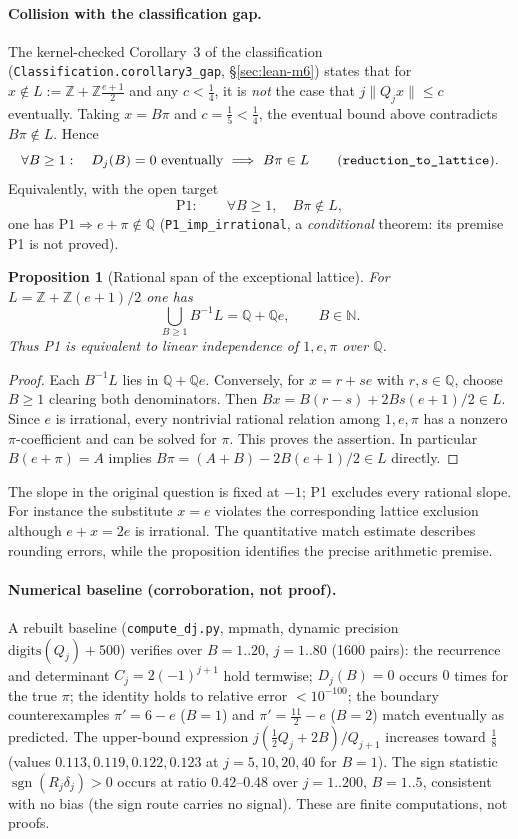 \documentclass[11pt]{amsart}
\newtheorem{proposition}[theorem]{Proposition}
\theoremstyle{definition}
\theoremstyle{remark}
\numberwithin{equation}{section}
\newcommand{\Q}{\mathbb{Q}}
\newcommand{\Z}{\mathbb{Z}}
\newcommand{\N}{\mathbb{N}}
\begin{document}
\paragraph{Collision with the classification gap.} The kernel-checked Corollary~3 of the classification (\texttt{Classification.\allowbreak{}corollary3\_\allowbreak{}gap}, \S\ref{sec:lean-m6}) states that for $x\notin L:=\Z+\Z\frac{e+1}{2}$ and any $c<\tfrac14$, it is \emph{not} the case that $j\|Q_jx\|\le c$ eventually. Taking $x=B\pi$ and $c=\tfrac15<\tfrac14$, the eventual bound above contradicts $B\pi\notin L$. Hence
\[
\forall B\ge1:\quad D_j(B)=0\ \text{eventually}\ \Longrightarrow\ B\pi\in L
\qquad\text{(\texttt{reduction\_to\_lattice}).}
\]
Equivalently, with the open target
\[
\mathrm{P1}:\qquad \forall B\ge1,\quad B\pi\notin L,
\]
one has $\mathrm{P1}\Rightarrow e+\pi\notin\Q$ (\texttt{P1\_imp\_irrational}, a \emph{conditional} theorem: its premise P1 is not proved).

\begin{proposition}[Rational span of the exceptional lattice]
\label{prop:rational-span}
For $L=\Z+\Z(e+1)/2$ one has
\[
\bigcup_{B\ge1} B^{-1}L=\Q+\Q e,\qquad B\in\N.
\]
Thus P1 is equivalent to linear independence of $1,e,\pi$ over $\Q$.
\end{proposition}
\begin{proof}
Each $B^{-1}L$ lies in $\Q+\Q e$. Conversely, for $x=r+se$ with
$r,s\in\Q$, choose $B\ge1$ clearing both denominators. Then
$Bx=B(r-s)+2Bs(e+1)/2\in L$. Since $e$ is irrational, every
nontrivial rational relation among $1,e,\pi$ has a nonzero
$\pi$-coefficient and can be solved for $\pi$. This proves the assertion.
In particular $B(e+\pi)=A$ implies
$B\pi=(A+B)-2B(e+1)/2\in L$ directly.
\end{proof}
The slope in the original question is fixed at $-1$; P1 excludes every
rational slope. For instance the substitute $x=e$ violates the
corresponding lattice exclusion although $e+x=2e$ is irrational.
The quantitative match estimate describes rounding errors, while the
proposition identifies the precise arithmetic premise.

\paragraph{Numerical baseline (corroboration, not proof).} A rebuilt baseline (\texttt{compute\_dj.py}, mpmath, dynamic precision $\mathrm{digits}(Q_j)+500$) verifies over $B=1..20$, $j=1..80$ (1600 pairs): the recurrence and determinant $C_j=2(-1)^{j+1}$ hold termwise; $D_j(B)=0$ occurs $0$ times for the true $\pi$; the identity holds to relative error $<10^{-100}$; the boundary counterexamples $\pi'=6-e$ ($B=1$) and $\pi'=\tfrac{11}{2}-e$ ($B=2$) match eventually as predicted. The upper-bound expression $j(\tfrac12Q_j+2B)/Q_{j+1}$ increases toward $\tfrac18$ (values $0.113,0.119,0.122,0.123$ at $j=5,10,20,40$ for $B=1$). The sign statistic $\operatorname{sgn}(R_j\delta_j)>0$ occurs at ratio $0.42$--$0.48$ over $j=1..200$, $B=1..5$, consistent with no bias (the sign route carries no signal). These are finite computations, not proofs.
\end{document}
